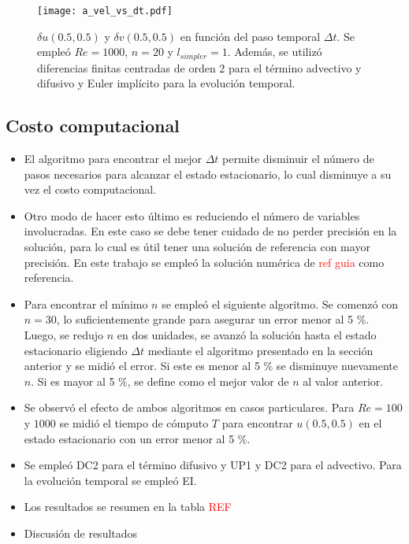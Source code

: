 \documentclass[aps,prb,twocolumn,superscriptaddress,floatfix,longbibliography,10pt]{revtex4-2}
\newif\ifptitle
\newif\ifpnumber
\newcounter{para}
\newcommand\ptitle[1]{\par\refstepcounter{para}
{\ifpnumber{\noindent\textcolor{lightgray}{\textbf{\thepara}}\indent}\fi}
{\ifptitle{\textbf{[{#1}]}}\fi}}
\begin{document}
\begin{figure}[h]
  \texttt{[image: a\_vel\_vs\_dt.pdf]}
  \caption{$\delta u(0.5,0.5)$ y $\delta v(0.5,0.5)$ en función del paso temporal $\Delta t$. Se empleó $Re = 1000$, $n = 20$ y $l_{simpler} = 1$. Además, se utilizó diferencias finitas centradas de orden 2 para el término advectivo y difusivo y Euler implícito para la evolución temporal.}
   \label{fig:a_vel_vs_dt}
\end{figure}


\subsection{Costo computacional}

\ptitle{Resumen}
\begin{itemize}
  \item El algoritmo para encontrar el mejor $\Delta t$ permite disminuir el número de pasos necesarios para alcanzar el estado estacionario, lo cual disminuye a su vez el costo computacional.
  \item Otro modo de hacer esto último es reduciendo el número de variables involucradas. En este caso se debe tener cuidado de no perder precisión en la solución, para lo cual es útil tener una solución de referencia con mayor precisión. En este trabajo se empleó la solución numérica de \textcolor{red}{ref guia} como referencia.
  \item Para encontrar el mínimo $n$ se empleó el siguiente algoritmo. Se comenzó con $n = 30$, lo suficientemente grande para asegurar un error menor al 5 \%. Luego, se redujo $n$ en dos unidades, se avanzó la solución hasta el estado estacionario eligiendo $\Delta t$ mediante el algoritmo presentado en la sección anterior y se midió el error. Si este es menor al 5 \% se disminuye nuevamente $n$. Si es mayor al 5 \%, se define como el mejor valor de $n$ al valor anterior.
  \item Se observó el efecto de ambos algoritmos en casos particulares. Para $Re = 100$ y $1000$ se midió el tiempo de cómputo $T$ para encontrar $u(0.5,0.5)$ en el estado estacionario con un error menor al 5 \%.
  \item Se empleó DC2 para el término difusivo y UP1 y DC2 para el advectivo. Para la evolución temporal se empleó EI.
  \item Los resultados se resumen en la tabla \textcolor{red}{REF}
  \item Discusión de resultados
\end{itemize}
\end{document}
